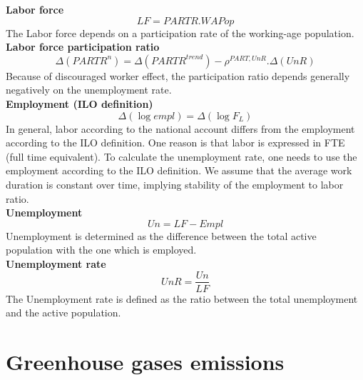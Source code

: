 \documentclass[12pt]{article}
\numberwithin{equation}{section}
\begin{document}
\noindent\textbf{Labor force} \\
\begin{dmath}
LF = PARTR . WAPop
\end{dmath}
The Labor force depends on a participation rate of the working-age population. \\

\noindent\textbf{Labor force participation ratio} \\
\begin{dmath}
\varDelta \left(PARTR^{n}\right) = \varDelta \left(PARTR^{trend}\right) - \rho^{PART,UnR} . \varDelta \left(UnR\right)
\end{dmath}
Because of discouraged worker effect, the participation ratio depends generally negatively on the unemployment rate. \\

\noindent\textbf{Employment (ILO definition)} \\
\begin{dmath}
\varDelta \left(\operatorname{log} empl\right) = \varDelta \left(\operatorname{log} F_{L}\right)
\end{dmath}
In general, labor according to the national account differs from the employment according to the ILO definition. One reason is that labor is expressed in FTE (full time equivalent). To calculate the unemployment rate, one needs to use the employment according to the ILO definition. We assume that the average work duration is constant over time, implying stability of the employment to labor ratio. \\

\noindent\textbf{Unemployment} \\
\begin{dmath}
Un = LF - Empl
\end{dmath}
Unemployment is determined as the difference between the total active population with the one which is employed. \\

\noindent\textbf{Unemployment rate} \\
\begin{dmath}
UnR = \frac{Un}{LF}
\end{dmath}
The Unemployment rate is defined as the ratio between the total unemployment and the active population.


\section{Greenhouse gases emissions}
\end{document}
